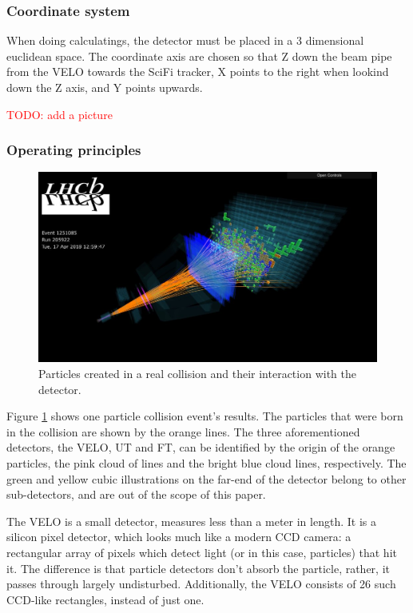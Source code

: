 \documentclass[12pt]{article}
\begin{document}
\subsubsection{Coordinate system}\label{sec_coordinate_system}

When doing calculatings, the detector must be placed in a 3 dimensional euclidean space. The coordinate axis are chosen so that Z down the beam pipe from the VELO towards the SciFi tracker, X points to the right when lookind down the Z axis, and Y points upwards.

\textcolor{red}{TODO: add a picture}


\subsubsection{Operating principles}\label{sec_lhcb_det_theory}

\begin{figure}[H]
	\includegraphics[width=\textwidth]{lbevent_collision_example}
	\caption{Particles created in a real collision and their interaction with the detector.}
	\label{fig_lhcb_lbevent_collision}
\end{figure}


Figure \ref{fig_lhcb_lbevent_collision} shows one particle collision event's results. The particles that were born in the collision are shown by the orange lines. The three aforementioned detectors, the VELO, UT and FT, can be identified by the origin of the orange particles, the pink cloud of lines and the bright blue cloud lines, respectively. The green and yellow cubic illustrations on the far-end of the detector belong to other sub-detectors, and are out of the scope of this paper.

The VELO is a small detector, measures less than a meter in length. It is a silicon pixel detector, which looks much like a modern CCD camera: a rectangular array of pixels which detect light (or in this case, particles) that hit it. The difference is that particle detectors don't absorb the particle, rather, it passes through largely undisturbed. Additionally, the VELO consists of 26 such CCD-like rectangles, instead of just one.
\end{document}
